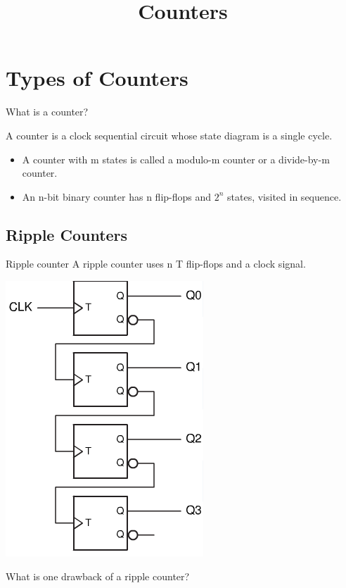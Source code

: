 \title{Counters}

\section{Types of Counters}

\begin{frame}{What is a counter?}
  \begin{definition}
    A \alert{counter} is a clock sequential circuit whose state diagram is a single cycle.
  \end{definition}
  \begin{itemize}
    \item A counter with m states is called a \alert{modulo-m counter} or a \alert{divide-by-m counter}.
    \item An \alert{n-bit binary counter} has n flip-flops and $2^n$ states, visited in sequence.
  \end{itemize}
\end{frame}

\subsection{Ripple Counters}

\begin{frame}{Ripple counter}
  A ripple counter uses n T flip-flops and a clock signal.
  \begin{center}
    \includegraphics[scale=0.3]{RippleCounterLogic}
  \end{center}
  What is one drawback of a ripple counter?
\end{frame}

